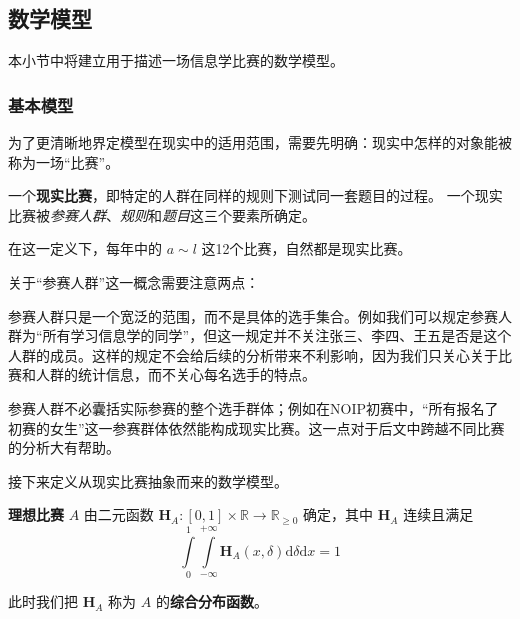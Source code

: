     \subsection{数学模型}

        本小节中将建立用于描述一场信息学比赛的数学模型。

        \subsubsection{基本模型}
        
            为了更清晰地界定模型在现实中的适用范围，需要先明确：现实中怎样的对象能被称为一场“比赛”。

            \begin{definition}[现实比赛]
                一个\textbf{现实比赛}，即特定的人群在同样的规则下测试同一套题目的过程。
                一个现实比赛被\emph{参赛人群}、\emph{规则}和\emph{题目}这三个要素所确定。
                \label{def:realContest}
            \end{definition}

            在这一定义下，每年中的 $a\sim l$ 这12个比赛，自然都是现实比赛。
            
            \vspace{1.5ex}

            关于“参赛人群”这一概念需要注意两点：
            
            \begin{asparaitem}
                \item 参赛人群只是一个宽泛的范围，而不是具体的选手集合。例如我们可以规定参赛人群为“所有学习信息学的同学”，但这一规定并不关注张三、李四、王五是否是这个人群的成员。这样的规定不会给后续的分析带来不利影响，因为我们只关心关于比赛和人群的统计信息，而不关心每名选手的特点。
                \item 参赛人群不必囊括实际参赛的整个选手群体；例如在NOIP初赛中，“所有报名了初赛的女生”这一参赛群体依然能构成现实比赛。这一点对于后文中跨越不同比赛的分析大有帮助。
            \end{asparaitem}
            
            \vspace{1.5ex}

            接下来定义从现实比赛抽象而来的数学模型。

            \begin{definition}[理想比赛]
                \textbf{理想比赛} $A$ 由二元函数 $\bm{H}_A:\left[0,1\right]\times\mathbb{R}\to\mathbb{R}_{\geq 0}$ 确定，其中 $\bm{H}_A$ 连续且满足
                $$
                \int\limits_0^1\int\limits_{-\infty}^{+\infty} \bm{H}_A(x,\delta)\mathrm{d}\delta\mathrm{d}x=1
                $$

                此时我们把 $\bm{H}_A$ 称为 $A$ 的\textbf{综合分布函数}。
                \label{def:idealContest}
            \end{definition}


